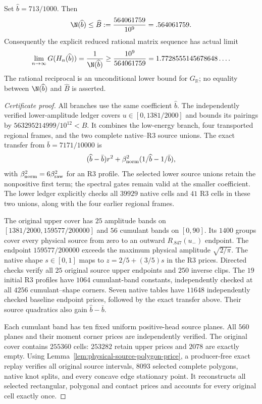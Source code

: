 \begin{theorem}
\label{thm:final-preferred-polygon}
Set $\widehat b=713/1000$. Then
\[
 \N(\widehat b)\le\widehat B:=\frac{564061759}{10^9}=.564061759.
\]
Consequently the explicit reduced rational matrix sequence has actual limit
\[
 \lim_{n\to\infty}G(H_n(\widehat b))
 =\frac1{\N(\widehat b)}
 \ge\frac{10^9}{564061759}
 =1.7728555145678648\ldots .
\]
The rational reciprocal is an unconditional lower bound for
$G_{\mathbb R}$; no equality between $\N(\widehat b)$ and
$\widehat B$ is asserted.
\end{theorem}
\begin{proof}[Certificate proof]
All branches use the same coefficient $\widehat b$. The independently
verified lower-amplitude ledger covers $u\in[0,1381/2000]$ and bounds
its pairings by $563295214999/10^{12}<\widehat B$. It combines the
low-energy branch, four transported regional frames, and the two complete
native--R3 source unions. The exact transfer from
$\bar b=7171/10000$ is
\[
 (\widehat b-\bar b)r^2+
 \beta_{\rm norm}^2(1/\widehat b-1/\bar b),
\]
with $\beta_{\rm norm}^2=6\beta_{\rm raw}^2$ for an R3 profile.
The selected lower source unions retain the nonpositive first term;
the spectral gates remain valid at the smaller coefficient. The lower
ledger explicitly checks all $39929$ native cells and $41$ R3 cells
in these two unions, along with the four earlier regional frames.

The original upper cover has $25$ amplitude bands on
$[1381/2000,159577/200000]$ and $56$ cumulant bands on $[0,90]$.
Its $1400$ groups cover every physical source from zero to an outward
$R_{.847}(u_-)$ endpoint. The endpoint $159577/200000$ exceeds the
maximum physical amplitude $\sqrt{2/\pi}$. The native shape
$s\in[0,1]$ maps to $z=2/5+(3/5)s$ in the R3 prices. Directed checks
verify all $25$ original source upper endpoints and $250$ inverse clips.
The $19$ initial R3 profiles have $1064$ cumulant-band constants,
independently checked at all $4256$ cumulant--shape corners. Seven
native tables have $11648$ independently checked baseline endpoint
prices, followed by the exact transfer above. Their source quadratics
also gain $\widehat b-\bar b$.

Each cumulant band has ten fixed uniform positive-head source planes.
All $560$ planes and their moment corner prices are independently
verified. The original cover contains $255360$ cells: $253282$ retain
upper prices and $2078$ are exactly empty. Using
Lemma~\ref{lem:physical-source-polygon-price}, a producer-free exact
replay verifies all original source intervals, $8093$ selected complete
polygons, native knot splits, and every concave edge stationary point.
It reconstructs all selected rectangular, polygonal and contact prices
and accounts for every original cell exactly once.


\end{proof}
